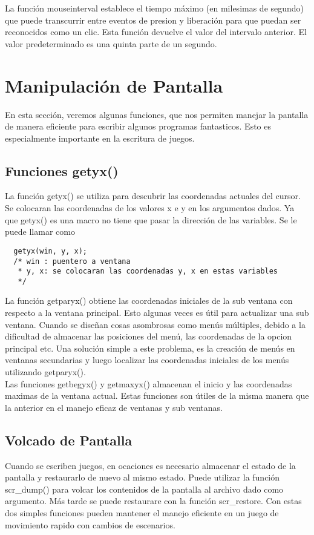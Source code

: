 \documentclass{article}
\begin{document}
La función mouseinterval establece el tiempo máximo (en milesimas de segundo)
que puede transcurrir entre eventos de presion y liberación para que puedan ser
reconocidos como un clic. Esta función devuelve el valor del intervalo
anterior. El valor predeterminado es una quinta parte de un segundo.

\section{Manipulación de Pantalla}%
En esta sección, veremos algunas funciones, que nos permiten manejar la
pantalla de manera eficiente para escribir algunos programas fantasticos. Esto
es especialmente importante en la escritura de juegos.

\subsection{Funciones getyx()}%
La función getyx() se utiliza para descubrir las coordenadas actuales del
cursor. Se colocaran las coordenadas de los valores x e y en los argumentos
dados. Ya que getyx() es una macro no tiene que pasar la dirección de las
variables. Se le puede llamar como

\begin{verbatim}
  getyx(win, y, x);
  /* win : puentero a ventana
   * y, x: se colocaran las coordenadas y, x en estas variables
   */
\end{verbatim}

La función getparyx() obtiene las coordenadas iniciales de la sub ventana con
respecto a la ventana principal. Esto algunas veces es útil para actualizar una
sub ventana. Cuando se diseñan cosas asombrosas como menús múltiples, debido a
la dificultad de almacenar las posiciones del menú, las coordenadas de la
opcion principal etc. Una solución simple a este problema, es la creación de
menús en ventanas secundarias y luego localizar las coordenadas iniciales de
los menús utilizando getparyx().\\

Las funciones getbegyx() y getmaxyx() almacenan el inicio y las coordenadas
maximas de la ventana actual. Estas funciones son útiles de la misma manera que
la anterior en el manejo eficaz de ventanas y sub ventanas.

\subsection{Volcado de Pantalla}%
Cuando se escriben juegos, en ocaciones es necesario almacenar el estado de la
pantalla y restaurarlo de nuevo al mismo estado. Puede utilizar la función
scr\_dump() para volcar los contenidos de la pantalla al archivo dado como
argumento. Más tarde se puede restaurare con la función scr\_restore. Con estas
dos simples funciones pueden mantener el manejo eficiente en un juego de
movimiento rapido con cambios de escenarios.
\end{document}
